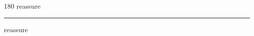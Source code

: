 
\begin{frame}
\begin{center}
\begin{turn}{180}
{\fontsize{2.5cm}{1em}\selectfont reassure}
\end{turn}
\vspace{1em}\par  
\hrule
\vspace{1em}\par  
{\fontsize{2.5cm}{1em}\selectfont reassure}
\end{center}
\end{frame}

